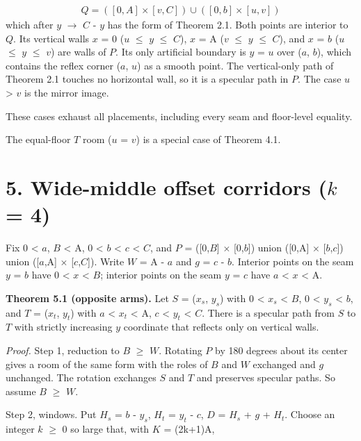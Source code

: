 \documentclass[11pt]{article}
\begin{document}
\begin{gather*}
Q = ([0,A] \times [v,C]) \cup ([0,b] \times [u,v])
\end{gather*}
which after \(y\) \(\to\) \(C\) - \(y\) has the form of Theorem 2.1. Both points are interior to \(Q\). Its vertical walls \(x\) = 0 (\(u\) \(\le\) \(y\) \(\le\) \(C\)), \(x\) = A (\(v\) \(\le\) \(y\) \(\le\) \(C\)), and \(x\) = \(b\) (\(u\) \(\le\) \(y\) \(\le\) \(v\)) are walls of \(P\). Its only artificial boundary is \(y\) = \(u\) over (\(a\), \(b\)), which contains the reflex corner (\(a\), \(u\)) as a smooth point. The vertical-only path of Theorem 2.1 touches no horizontal wall, so it is a specular path in \(P\). The case \(u\) > \(v\) is the mirror image.

These cases exhaust all placements, including every seam and floor-level equality.

The equal-floor \(T\) room (\(u\) = \(v\)) is a special case of Theorem 4.1.

\section*{5. Wide-middle offset corridors (\(k\) = 4)}
Fix 0 < \(a\), \(B\) < A, 0 < \(b\) < \(c\) < \(C\), and \(P\) = ([0,\(B\)] \(\times\) [0,\(b\)]) union ([0,A] \(\times\) [\(b\),\(c\)]) union ([\(a\),A] \(\times\) [\(c\),\(C\)]). Write \(W\) = A - \(a\) and \(g\) = \(c\) - \(b\). Interior points on the seam \(y\) = \(b\) have 0 < \(x\) < \(B\); interior points on the seam \(y\) = \(c\) have \(a\) < \(x\) < A.

\textbf{Theorem 5.1 (opposite arms).} Let \(S\) = (\(x_{s}\), \(y_{s}\)) with 0 < \(x_{s}\) < \(B\), 0 < \(y_{s}\) < \(b\), and \(T\) = (\(x_{t}\), \(y_{t}\)) with \(a\) < \(x_{t}\) < A, \(c\) < \(y_{t}\) < \(C\). There is a specular path from \(S\) to \(T\) with strictly increasing \(y\) coordinate that reflects only on vertical walls.

\emph{Proof.} Step 1, reduction to \(B\) \(\ge\) \(W\). Rotating \(P\) by 180 degrees about its center gives a room of the same form with the roles of \(B\) and \(W\) exchanged and \(g\) unchanged. The rotation exchanges \(S\) and \(T\) and preserves specular paths. So assume \(B\) \(\ge\) \(W\).

Step 2, windows. Put \(H_{s}\) = \(b\) - \(y_{s}\), \(H_{t}\) = \(y_{t}\) - \(c\), \(D\) = \(H_{s}\) + \(g\) + \(H_{t}\). Choose an integer \(k\) \(\ge\) 0 so large that, with \(K\) = (2k+1)A,
\end{document}
